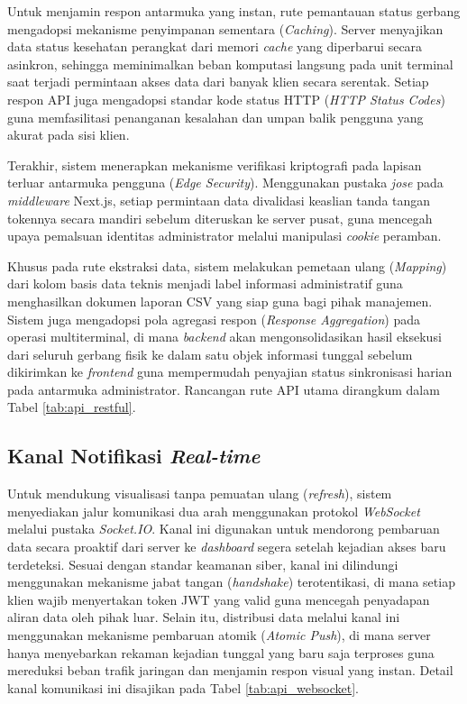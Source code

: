 Untuk menjamin respon antarmuka yang instan, rute pemantauan status gerbang mengadopsi mekanisme penyimpanan sementara (\textit{Caching}). Server menyajikan data status kesehatan perangkat dari memori \textit{cache} yang diperbarui secara asinkron, sehingga meminimalkan beban komputasi langsung pada unit terminal saat terjadi permintaan akses data dari banyak klien secara serentak. Setiap respon API juga mengadopsi standar kode status HTTP (\textit{HTTP Status Codes}) guna memfasilitasi penanganan kesalahan dan umpan balik pengguna yang akurat pada sisi klien. 

Terakhir, sistem menerapkan mekanisme verifikasi kriptografi pada lapisan terluar antarmuka pengguna (\textit{Edge Security}). Menggunakan pustaka \textit{jose} pada \textit{middleware} Next.js, setiap permintaan data divalidasi keaslian tanda tangan tokennya secara mandiri sebelum diteruskan ke server pusat, guna mencegah upaya pemalsuan identitas administrator melalui manipulasi \textit{cookie} peramban. 

Khusus pada rute ekstraksi data, sistem melakukan pemetaan ulang (\textit{Mapping}) dari kolom basis data teknis menjadi label informasi administratif guna menghasilkan dokumen laporan CSV yang siap guna bagi pihak manajemen. Sistem juga mengadopsi pola agregasi respon (\textit{Response Aggregation}) pada operasi multiterminal, di mana \textit{backend} akan mengonsolidasikan hasil eksekusi dari seluruh gerbang fisik ke dalam satu objek informasi tunggal sebelum dikirimkan ke \textit{frontend} guna mempermudah penyajian status sinkronisasi harian pada antarmuka administrator. Rancangan rute API utama dirangkum dalam Tabel \ref{tab:api_restful}.



\subsection{Kanal Notifikasi \textit{Real-time}}
Untuk mendukung visualisasi tanpa pemuatan ulang (\textit{refresh}), sistem menyediakan jalur komunikasi dua arah menggunakan protokol \textit{WebSocket} melalui pustaka \textit{Socket.IO}. Kanal ini digunakan untuk mendorong pembaruan data secara proaktif dari server ke \textit{dashboard} segera setelah kejadian akses baru terdeteksi. Sesuai dengan standar keamanan siber, kanal ini dilindungi menggunakan mekanisme jabat tangan (\textit{handshake}) terotentikasi, di mana setiap klien wajib menyertakan token JWT yang valid guna mencegah penyadapan aliran data oleh pihak luar. Selain itu, distribusi data melalui kanal ini menggunakan mekanisme pembaruan atomik (\textit{Atomic Push}), di mana server hanya menyebarkan rekaman kejadian tunggal yang baru saja terproses guna mereduksi beban trafik jaringan dan menjamin respon visual yang instan. Detail kanal komunikasi ini disajikan pada Tabel \ref{tab:api_websocket}.

